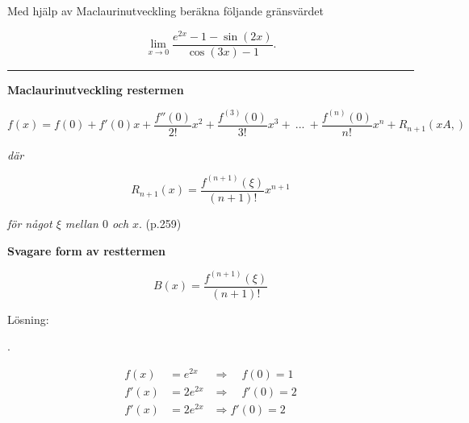 \documentclass[11pt]{article}
\newcommand*\circled[1]{\tikz[baseline=(char.base)]{
            \node[shape=circle,draw,inner sep=1pt] (char) {#1};}}
\begin{document}
Med hjälp av Maclaurinutveckling beräkna följande gränsvärdet

\[
    \lim_{x \to 0} \frac{e^{2x} - 1 - \sin(2x)}{\cos(3x) - 1}.
\]

\noindent\rule{\textwidth}{0.5pt}

\textbf{Maclaurinutveckling restermen}

\[
    f(x) = f(0) + f'(0)x + \frac{f''(0)}{2!}x^2 + \frac{f^{(3)}(0)}{3!}x^3 +\ ...\ + \frac{f^{(n)}(0)}{n!}x^n + R_{n + 1}(xA,)
\]

\textit{där}


\[
    R_{n + 1}(x) = \frac{f^{(n + 1)}(\xi)}{(n +  1)!}x^{n + 1}
\]

\textit{för något $\xi$ mellan $0$ och $x$}. (p.259)

\textbf{Svagare form av resttermen}

\[
    B(x) = \frac{f^{(n + 1)}(\xi)}{(n + 1)!}
\]

Lösning:

\circled{1}.%
\begin{minipage}[t]{5cm}
    \setlength{\abovedisplayskip}{0pt}
    \setlength{\belowdisplayskip}{0pt}
    \setlength{\abovedisplayshortskip}{0pt}
    \setlength{\belowdisplayshortskip}{0pt}
    \begin{align*}
        f(x)  &= e^{2x} &\Rightarrow\quad f(0) = 1\\
        f'(x) &= 2e^{2x} &\Rightarrow\quad f'(0) = 2\\
        f'(x) &= 2e^{2x} &\Rightarrow f'(0) = 2\\
    \end{align*}
\end{minipage}
\end{document}
